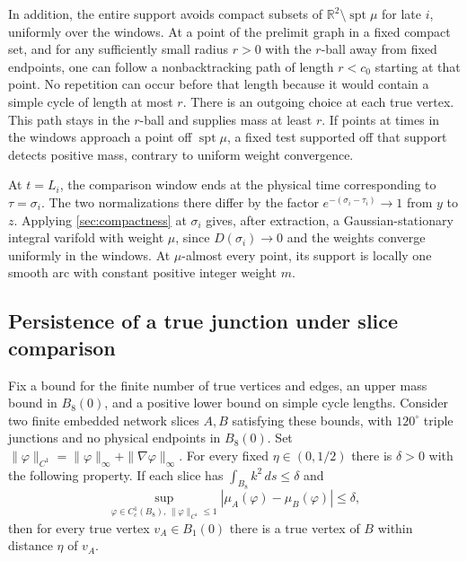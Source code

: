 In addition, the entire support avoids compact subsets of \(\mathbb R^2\setminus\operatorname{spt}\mu\) for late \(i\), uniformly over the windows. At a point of the prelimit graph in a fixed compact set, and for any sufficiently small radius \(r>0\) with the \(r\)-ball away from fixed endpoints, one can follow a nonbacktracking path of length \(r<c_0\) starting at that point. No repetition can occur before that length because it would contain a simple cycle of length at most \(r\). There is an outgoing choice at each true vertex. This path stays in the \(r\)-ball and supplies mass at least \(r\). If points at times in the windows approach a point off \(\operatorname{spt}\mu\), a fixed test supported off that support detects positive mass, contrary to uniform weight convergence.

At \(t=L_i\), the comparison window ends at the physical time corresponding to \(\tau=\sigma_i\). The two normalizations there differ by the factor \(e^{-(\sigma_i-\tau_i)}\to1\) from \(y\) to \(z\). Applying \cref{sec:compactness} at \(\sigma_i\) gives, after extraction, a Gaussian-stationary integral varifold with weight \(\mu\), since \(D(\sigma_i)\to0\) and the weights converge uniformly in the windows. At \(\mu\)-almost every point, its support is locally one smooth arc with constant positive integer weight \(m\).

\subsection{Persistence of a true junction under slice comparison}\label{sec:vertices}

\begin{lemma}\label{lem:vertices}
Fix a bound for the finite number of true vertices and edges, an upper mass bound in \(B_8(0)\), and a positive lower bound on simple cycle lengths. Consider two finite embedded network slices \(A,B\) satisfying these bounds, with \(120^\circ\) triple junctions and no physical endpoints in \(B_8(0)\). Set \(\|\varphi\|_{C^1}=\|\varphi\|_\infty+\|\nabla\varphi\|_\infty\). For every fixed \(\eta\in(0,1/2)\) there is \(\delta>0\) with the following property. If each slice has \(\int_{B_8}k^2\,ds\le\delta\) and
\begin{equation}\label{eq:slice-weight}
\sup_{\varphi\in C_c^1(B_8),\,\|\varphi\|_{C^1}\le1}
     |\mu_A(\varphi)-\mu_B(\varphi)|\le\delta,
\end{equation}
then for every true vertex \(v_A\in B_1(0)\) there is a true vertex of \(B\) within distance \(\eta\) of \(v_A\).

\end{lemma}

